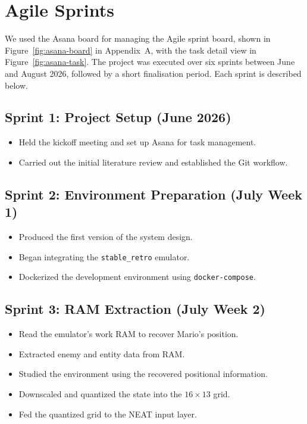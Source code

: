 \section{Agile Sprints}
\label{sec:agile-sprints}

We used the Asana board for managing the Agile sprint board, shown in
Figure~\ref{fig:asana-board} in Appendix~A, with the task detail view in
Figure~\ref{fig:asana-task}. The project was executed over six sprints between
June and August 2026, followed by a short finalisation period. Each sprint is
described below.

\subsection{Sprint 1: Project Setup (June 2026)}

\begin{itemize}
    \item Held the kickoff meeting and set up Asana for task management.
    \item Carried out the initial literature review and established the Git
    workflow.
\end{itemize}

\subsection{Sprint 2: Environment Preparation (July Week 1)}

\begin{itemize}
    \item Produced the first version of the system design.
    \item Began integrating the \texttt{stable\_retro} emulator.
    \item Dockerized the development environment using \texttt{docker-compose}.
\end{itemize}

\subsection{Sprint 3: RAM Extraction (July Week 2)}

\begin{itemize}
    \item Read the emulator's work RAM to recover Mario's position.
    \item Extracted enemy and entity data from RAM.
    \item Studied the environment using the recovered positional information.
    \item Downscaled and quantized the state into the $16 \times 13$ grid.
    \item Fed the quantized grid to the NEAT input layer.
\end{itemize}

